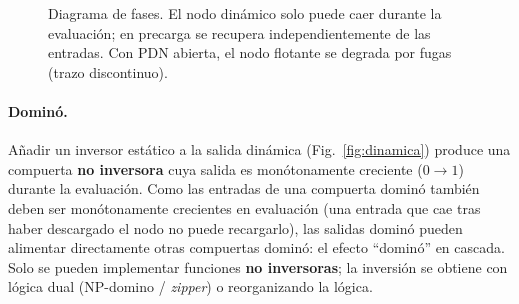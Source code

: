 \documentclass[11pt,a4paper]{article}
\begin{document}
\begin{figure}[htb]
\centering
{}
\caption{Diagrama de fases. El nodo dinámico solo puede caer durante la evaluación; en precarga se recupera independientemente de las entradas. Con PDN abierta, el nodo flotante se degrada por fugas (trazo discontinuo).}
\label{fig:fases}
\end{figure}

\paragraph{Dominó.} Añadir un inversor estático a la salida dinámica (Fig.~\ref{fig:dinamica}) produce una compuerta \textbf{no inversora} cuya salida es monótonamente creciente ($0\to1$) durante la evaluación. Como las entradas de una compuerta dominó también deben ser monótonamente crecientes en evaluación (una entrada que cae tras haber descargado el nodo no puede recargarlo), las salidas dominó pueden alimentar directamente otras compuertas dominó: el efecto ``dominó'' en cascada. Solo se pueden implementar funciones \textbf{no inversoras}; la inversión se obtiene con lógica dual (NP-domino / \emph{zipper}) o reorganizando la lógica.
\end{document}
